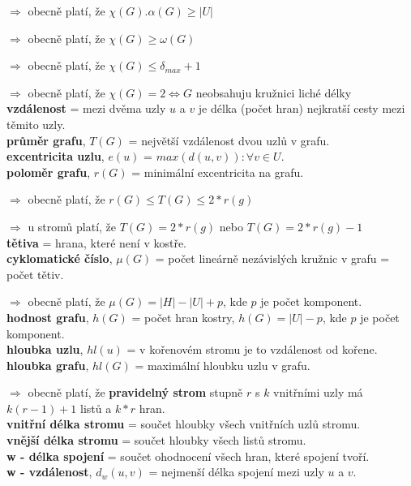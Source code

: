 \documentclass[12pt]{article}
\begin{document}
$\Rightarrow$ obecně platí, že $\chi(G) . \alpha(G) \geq \left|U\right|$

$\Rightarrow$ obecně platí, že $\chi(G) \geq \omega(G)$

$\Rightarrow$ obecně platí, že $\chi(G) \leq \delta_{max}+1$

$\Rightarrow$ obecně platí, že $\chi(G) = 2 \Leftrightarrow G$ neobsahuju kružnici liché délky\\

\noindent
\textbf{vzdálenost} = mezi dvěma uzly $u$ a $v$ je délka (počet hran) nejkratší cesty mezi těmito uzly.\\
\textbf{průměr grafu}, $T(G)$ = největší vzdálenost dvou uzlů v grafu.\\
\textbf{excentricita uzlu}, $e(u)$ = $max(d(u, v)) : \forall v \in U$.\\
\textbf{poloměr grafu}, $r(G)$ = minimální excentricita na grafu.

$\Rightarrow$ obecně platí, že $r(G) \leq T(G) \leq 2*r(g)$

$\Rightarrow$ u stromů platí, že $T(G) = 2*r(g)$ nebo $T(G) = 2*r(g)-1$\\


\noindent
\textbf{tětiva} = hrana, které není v kostře.\\
\textbf{cyklomatické číslo}, $\mu(G)$ = počet lineárně nezávislých kružnic v grafu = počet tětiv.

$\Rightarrow$ obecně platí, že $\mu(G) = \left|H\right| - \left|U\right| + p$, kde $p$ je počet komponent.\\
\textbf{hodnost grafu}, $h(G)$ = počet hran kostry, $h(G) = \left|U\right| - p$, kde $p$ je počet komponent.\\
\textbf{hloubka uzlu}, $hl(u)$ = v kořenovém stromu je to vzdálenost od kořene.\\
\textbf{hloubka grafu}, $hl(G)$ = maximální hloubku uzlu v grafu.

$\Rightarrow$ obecně platí, že \textbf{pravidelný strom} stupně $r$ s $k$ vnitřními uzly má $k(r-1)+1$ listů a $k*r$ hran.\\

\noindent
\textbf{vnitřní délka stromu} = součet hloubky všech vnitřních uzlů stromu.\\
\textbf{vnější délka stromu} = součet hloubky všech listů stromu.\\

\noindent
\textbf{w - délka spojení} = součet ohodnocení všech hran, které spojení tvoří.\\
\textbf{w - vzdálenost}, $d_w(u, v)$ = nejmenší délka spojení mezi uzly $u$ a $v$.\\
\end{document}
